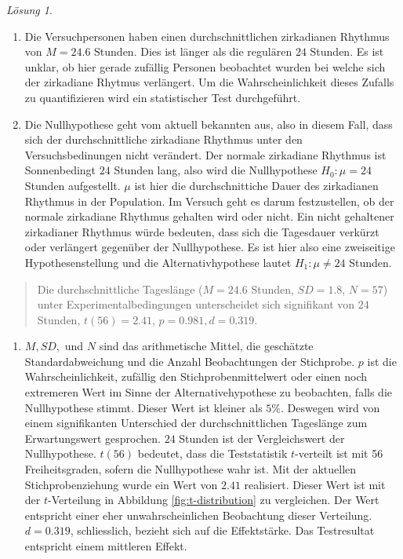 \documentclass[
]{book}
\providecommand{\tightlist}{%
  \setlength{\itemsep}{0pt}\setlength{\parskip}{0pt}}
\theoremstyle{definition}
\theoremstyle{definition}
\theoremstyle{definition}
\theoremstyle{definition}
\theoremstyle{remark}
\newtheorem*{solution}{Lösung}
\begin{document}
\begin{solution}
\begin{enumerate}
\def\labelenumi{\alph{enumi})}
\tightlist
\item
  Die Versuchpersonen haben einen durchschnittlichen zirkadianen Rhythmus von \(M = 24.6\) Stunden. Dies ist länger als die regulären \(24\) Stunden. Es ist unklar, ob hier gerade zufällig Personen beobachtet wurden bei welche sich der zirkadiane Rhytmus verlängert. Um die Wahrscheinlichkeit dieses Zufalls zu quantifizieren wird ein statistischer Test durchgeführt.
\item
  Die Nullhypothese geht vom aktuell bekannten aus, also in diesem Fall, dass sich der durchschnittliche zirkadiane Rhythmus unter den Versuchsbedinungen nicht verändert. Der normale zirkadiane Rhythmus ist Sonnenbedingt \(24\) Stunden lang, also wird die Nullhypothese \(H_0: \mu = 24\) Stunden aufgestellt. \(\mu\) ist hier die durchschnittiche Dauer des zirkadianen Rhythmus in der Population. Im Versuch geht es darum festzustellen, ob der normale zirkadiane Rhythmus gehalten wird oder nicht. Ein nicht gehaltener zirkadianer Rhythmus würde bedeuten, dass sich die Tagesdauer verkürzt oder verlängert gegenüber der Nullhypothese. Es ist hier also eine zweiseitige Hypothesenstellung und die Alternativhypothese lautet \(H_1: \mu \neq 24\) Stunden.
\end{enumerate}

\begin{quote}
Die durchschnittliche Tageslänge (\(M = 24.6\) Stunden, \(SD = 1.8\), \(N = 57\)) unter Experimentalbedingungen unterscheidet sich signifikant von \(24\) Stunden, \(t(56) = 2.41\), \(p = 0.981, d = 0.319\).
\end{quote}

\begin{enumerate}
\def\labelenumi{\alph{enumi})}
\setcounter{enumi}{2}
\tightlist
\item
  \(M, SD,\) und \(N\) sind das arithmetische Mittel, die geschätzte Standardabweichung und die Anzahl Beobachtungen der Stichprobe. \(p\) ist die Wahrscheinlichkeit, zufällig den Stichprobenmittelwert oder einen noch extremeren Wert im Sinne der Alternativehypothese zu beobachten, falls die Nullhypothese stimmt. Dieser Wert ist kleiner als \(5\%\). Deswegen wird von einem signifikanten Unterschied der durchschnittlichen Tageslänge zum Erwartungswert gesprochen. \(24\) Stunden ist der Vergleichswert der Nullhypothese. \(t(56)\) bedeutet, dass die Teststatistik \(t\)-verteilt ist mit 56 Freiheitsgraden, sofern die Nullhypothese wahr ist. Mit der aktuellen Stichprobenziehung wurde ein Wert von \(2.41\) realisiert. Dieser Wert ist mit der \(t\)-Verteilung in Abbildung \ref{fig:t-distribution} zu vergleichen. Der Wert entspricht einer eher unwahrscheinlichen Beobachtung dieser Verteilung. \(d = 0.319\), schliesslich, bezieht sich auf die Effektstärke. Das Testresultat entspricht einem mittleren Effekt.
\end{enumerate}

\end{solution}
\end{document}
